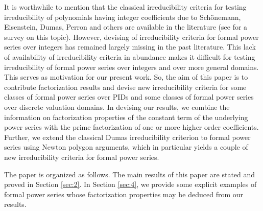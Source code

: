 \documentclass[12pt,reqno]{amsart}%
\begin{document}
It is worthwhile to mention that the classical irreducibility criteria for testing irreducibility of polynomials having integer coefficients due to Sch\"onemann, Eisenstein, Dumas, Perron and others  are available in the literature (see \cite{SKJS2023} for a survey on this topic). However, devising of irreducibility criteria for formal power series over integers has remained largely missing in the past literature. This lack of availability  of irreducibility criteria in abundance makes it difficult for testing irreducibility of  formal power series over integers and over more general domains. This serves as motivation for our present work. So, the aim of this paper is to contribute factorization results and devise new irreducibility criteria for some classes of formal power series over PIDs and some classes of formal power series over discrete valuation domains. In devising our results, we combine the information on factorization properties of the constant term of the underlying power series with the prime factorization of one or more higher order coefficients. Further, we extend the classical Dumas irreducibility criterion \cite{D} to formal power series using Newton polygon arguments, which in particular yields a couple of new  irreducibility criteria for formal power series.

The paper is organized as follows. The main results of this paper are stated and proved in Section \ref{sec:2}. In Section \ref{sec:4}, we provide some explicit examples of formal power series whose factorization properties may be deduced from our results.
\end{document}
